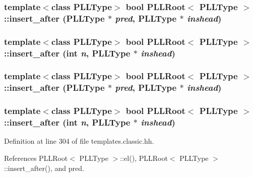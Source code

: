 \subsubsection{\setlength{\rightskip}{0pt plus 5cm}template$<$class PLLType$>$ bool PLLRoot$<$ {\bf PLLType} $>$::insert\_\-after ({\bf PLLType} $\ast$ {\em pred}, {\bf PLLType} $\ast$ {\em inshead})\hspace{0.3cm}{\tt  [inline]}}\label{classPLLRoot_a46}


\subsubsection{\setlength{\rightskip}{0pt plus 5cm}template$<$class PLLType$>$ bool PLLRoot$<$ {\bf PLLType} $>$::insert\_\-after (int {\em n}, {\bf PLLType} $\ast$ {\em inshead})\hspace{0.3cm}{\tt  [inline]}}\label{classPLLRoot_a30}


\subsubsection{\setlength{\rightskip}{0pt plus 5cm}template$<$class PLLType$>$ bool PLLRoot$<$ {\bf PLLType} $>$::insert\_\-after ({\bf PLLType} $\ast$ {\em pred}, {\bf PLLType} $\ast$ {\em inshead})\hspace{0.3cm}{\tt  [inline]}}\label{classPLLRoot_a29}


\subsubsection{\setlength{\rightskip}{0pt plus 5cm}template$<$class PLLType$>$ bool PLLRoot$<$ {\bf PLLType} $>$::insert\_\-after (int {\em n}, {\bf PLLType} $\ast$ {\em inshead})\hspace{0.3cm}{\tt  [inline]}}\label{classPLLRoot_a13}




Definition at line 304 of file templates.classic.hh.

References PLLRoot$<$ PLLType $>$::el(), PLLRoot$<$ PLLType $>$::insert\_\-after(), and pred.



